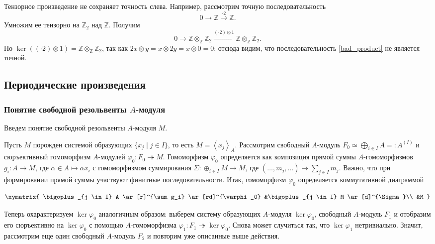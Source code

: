     Тензорное произведение не сохраняет точность слева. Например, рассмотрим точную последовательность
    \begin{equation*}
        0 \rightarrow \mathbb{Z} \xrightarrow{\cdot 2} \mathbb{Z}.
    \end{equation*}
    Умножим ее тензорно на $\mathbb{Z}_2$ над $\mathbb{Z}$. Получим
    \begin{equation} \label{bad_product}
        0 \rightarrow \mathbb{Z} \otimes_\mathbb{Z} \mathbb{Z}_2 \xrightarrow{(\cdot 2) \otimes 1} \mathbb{Z} \otimes_\mathbb{Z} \mathbb{Z}_2.
    \end{equation}
    Но $\ker((\cdot 2) \otimes 1) = \mathbb{Z} \otimes_\mathbb{Z} \mathbb{Z}_2$, так как $2x \otimes y = x \otimes 2y = x \otimes 0 = 0$; отсюда видим, 
    что последовательность \eqref{bad_product} не является точной.

    \subsection{Периодические произведения}

    \subsubsection{Понятие свободной резольвенты $A$-модуля}
    Введем понятие свободной резольвенты $A$-модуля $M$. 
    
    Пусть $M$ порожден системой образующих $\{x_j \mid j \in I\}$, то есть $M = \left<x_j \right>_A$.
    Рассмотрим свободный $A$-модуль $F_0 \simeq \bigoplus_{i\in I} A =: A^{(I)}$ и сюръективный гомоморфизм $A$-модулей $\varphi_0 : F_0 \twoheadrightarrow M$. Гомоморфизм
    $\varphi_0$ определяется как композиция прямой суммы $A$-гомоморфизмов $g_i : A \rightarrow M$, где $\alpha \in A \mapsto \alpha x_i$ с гомоморфизмом суммирования
    $\Sigma : \oplus_{i \in I}M \rightarrow M$, где $(\dots, m_j, \dots) \mapsto \sum_{j \in I} m_j$. Важно, что при формировании прямой суммы участвуют финитные последовательности.
    Итак, гомоморфизм $\varphi_0$ определяется коммутативной диаграммой

    $$        
        \xymatrix{
            \bigoplus_{j \in I} A \ar[r]^{\sum g_i} \ar[rd]^{\varphi_0}
            &\bigoplus_{j \in I} M \ar[d]^{\Sigma}\\
            &M
        }
    $$

    Теперь охарактеризуем $\ker \varphi_0$ аналогичным образом: выберем систему образующих $A$-модуля $\ker \varphi_0$, свободный $A$-модуль $F_1$ и отобразим его сюръективно на 
    $\ker \varphi_0$ с помощью $A$-гомоморфизма  $\varphi_1 : F_1 \twoheadrightarrow \ker \varphi_0$. Снова может случиться так, что $\ker \varphi_1$ нетривиально. Значит, рассмотрим еще один свободный $A$-модуль $F_2$
    и повторим уже описанные выше действия. 

